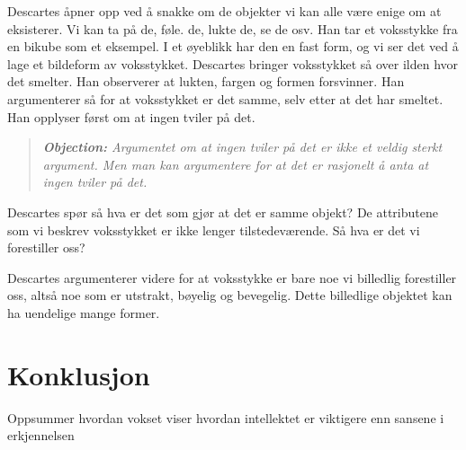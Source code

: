 \documentclass[11pt, a4paper]{article}
\newenvironment{objection}{\begin{quote}\itshape\textbf{Objection: }}{\end{quote}} %
\begin{document}
Descartes åpner opp ved å snakke om de objekter vi kan alle være enige om at eksisterer. Vi kan ta på de, føle. de, lukte de, se de osv. Han tar et voksstykke fra en bikube som et eksempel. I et øyeblikk har den en fast form, og vi ser det ved å lage et bildeform av voksstykket. Descartes bringer voksstykket så over ilden hvor det smelter. Han observerer at lukten, fargen og formen forsvinner. Han argumenterer så for at voksstykket er det samme, selv etter at det har smeltet. Han opplyser først om at ingen tviler på det. 

\begin{objection}
    Argumentet om at ingen tviler på det er ikke et veldig sterkt argument. Men man kan argumentere for at det er rasjonelt å anta at ingen tviler på det.
\end{objection}


Descartes spør så hva er det som gjør at det er samme objekt? De attributene som vi beskrev voksstykket er ikke lenger tilstedeværende. Så hva er det vi forestiller oss?


Descartes argumenterer videre for at voksstykke er bare noe vi billedlig forestiller oss, altså noe som er utstrakt, bøyelig og bevegelig. Dette billedlige objektet kan ha uendelige mange former.

\section{Konklusjon}

Oppsummer hvordan vokset viser hvordan intellektet er viktigere enn sansene i erkjennelsen
\end{document}

